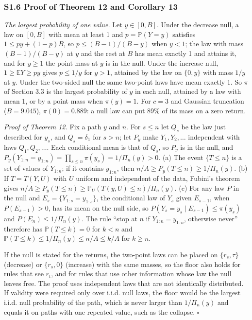 \documentclass[
]{article}
\begin{document}
\hypertarget{s1.6-proof-of-theorem-12-and-corollary-13}{%
\subsubsection{S1.6 Proof of Theorem 12 and Corollary
13}\label{s1.6-proof-of-theorem-12-and-corollary-13}}

\emph{The largest probability of one value.} Let \(y \in [0, B]\). Under
the decrease null, a law on \([0, B]\) with mean at least 1 and
\(p = \mathbb{P}(Y = y)\) satisfies \(1 \le py + (1 - p)B\), so
\(p \le (B-1)/(B-y)\) when \(y < 1\); the law with mass \((B-1)/(B-y)\)
at \(y\) and the rest at \(B\) has mean exactly 1 and attains it, and
for \(y \ge 1\) the point mass at \(y\) is in the null. Under the
increase null, \(1 \ge \mathbb{E}Y \ge py\) gives \(p \le 1/y\) for
\(y > 1\), attained by the law on \(\lbrace 0, y\rbrace\) with mass
\(1/y\) at \(y\). Under the two-sided null the same two-point laws have
mean exactly 1. So \(\pi\) of Section 3.3 is the largest probability of
\(y\) in each null, attained by a law with mean 1, or by a point mass
when \(\pi(y) = 1\). For \(c = 3\) and Gaussian truncation
(\(B = 9.045\)), \(\pi(0) = 0.889\): a null law can put 89\% of its mass
on a zero return.

\emph{Proof of Theorem 12.} Fix a path \(y\) and \(n\). For \(s \le n\)
let \(Q_s\) be the law just described for \(y_s\), and
\(Q_s = \delta_1\) for \(s > n\); let \(P_y\) make \(Y_1, Y_2, \dots\)
independent with laws \(Q_1, Q_2, \dots\). Each conditional mean is that
of \(Q_s\), so \(P_y\) is in the null, and
\(P_y(Y_{1:n} = y_{1:n}) = \prod_{s \le n}\pi(y_s) = 1/\Pi_n(y) > 0\).
(a) The event \(\lbrace T \le n\rbrace\) is a set of values of
\(Y_{1:n}\); if it contains \(y_{1:n}\), then
\(n/A \ge P_y(T \le n) \ge 1/\Pi_n(y)\). (b) If \(T = T(Y, U)\) with
\(U\) uniform and independent of the data, Fubini's theorem gives
\(n/A \ge P_y(T \le n) \ge \mathbb{P}_U(T(y, U) \le n)/\Pi_n(y)\). (c)
For any law \(P\) in the null and
\(E_s = \lbrace Y_{1:s} = y_{1:s}\rbrace\), the conditional law of
\(Y_s\) given \(E_{s-1}\), when \(P(E_{s-1}) > 0\), has its mean on the
null side, so \(P(Y_s = y_s \mid E_{s-1}) \le \pi(y_s)\) and
\(P(E_n) \le 1/\Pi_n(y)\). The rule ``stop at \(n\) if
\(Y_{1:n} = y_{1:n}\), otherwise never'' therefore has
\(\mathbb{P}(T \le k) = 0\) for \(k < n\) and
\(\mathbb{P}(T \le k) \le 1/\Pi_n(y) \le n/A \le k/A\) for \(k \ge n\).

If the null is stated for the returns, the two-point laws can be placed
on \(\lbrace r_s, \tau\rbrace\) (decrease) or \(\lbrace r_s, 0\rbrace\)
(increase) with the same masses, so the floor also holds for rules that
see \(r_t\), and for rules that use other information whose law the null
leaves free. The proof uses independent laws that are not identically
distributed. If validity were required only over i.i.d. null laws, the
floor would be the largest i.i.d. null probability of the path, which is
never larger than \(1/\Pi_n(y)\) and equals it on paths with one
repeated value, such as the collapse. \(\square\)
\end{document}
